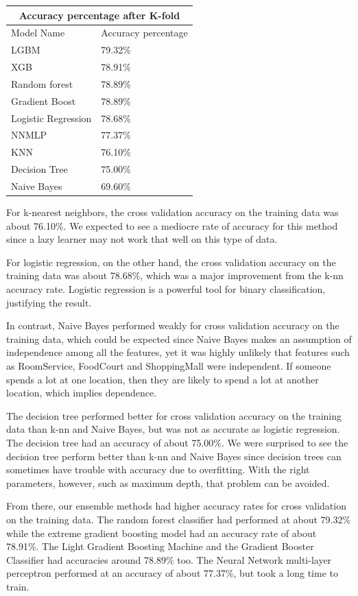 \documentclass[fleqn,10pt]{SelfArx} %
\begin{document}
\begin{tabular}{ |p{3cm}|p{3cm}|  }
\hline
\multicolumn{2}{|c|}{Accuracy percentage after K-fold} \\
\hline
Model Name& Accuracy percentage \\
\hline
LGBM & 79.32\% \\
XGB & 78.91\%\\
Random forest & 78.89\% \\
Gradient Boost    & 78.89\% \\
Logistic Regression & 78.68\%\\
NNMLP & 77.37\% \\
KNN & 76.10\%  \\
Decision Tree & 75.00\% \\
Naive Bayes	 & 69.60\%  \\
\hline
\end{tabular}

For k-nearest neighbors, the cross validation accuracy on the training data was about 76.10\%. We expected to see a mediocre rate of accuracy for this method since a lazy learner may not work that well on this type of data. 

For logistic regression, on the other hand, the cross validation accuracy on the training data was about 78.68\%, which was a major improvement from the k-nn accuracy rate. Logistic regression is a powerful tool for binary classification, justifying the result. 

In contrast, Naive Bayes performed weakly for cross validation accuracy on the training data, which could be expected since Naive Bayes makes an assumption of independence among all the features, yet it was highly unlikely that features such as RoomService, FoodCourt and ShoppingMall were independent. If someone spends a lot at one location, then they are likely to spend a lot at another location, which implies dependence. 

The decision tree performed better for cross validation accuracy on the training data than k-nn and Naive Bayes, but was not as accurate as logistic regression. The decision tree had an accuracy of about 75.00\%. We were surprised to see the decision tree perform better than k-nn and Naive Bayes since decision trees can sometimes have trouble with accuracy due to overfitting. With the right parameters, however, such as maximum depth, that problem can be avoided. 

From there, our ensemble methods had higher accuracy rates for cross validation on the training data. The random forest classifier had performed at about 79.32\% while the extreme gradient boosting model had an accuracy rate of about 78.91\%. The Light Gradient Boosting Machine and the Gradient Booster Classifier had accuracies around 78.89\% too. The Neural Network multi-layer perceptron performed at an accuracy of about 77.37\%, but took a long time to train.
\end{document}
